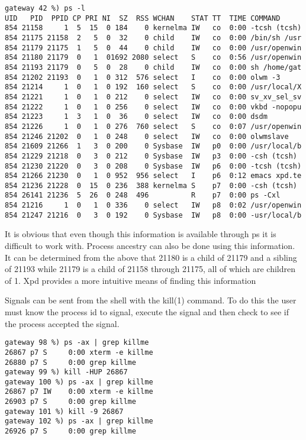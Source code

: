 \begin{verbatim}
gateway 42 %) ps -l
UID   PID  PPID CP PRI NI  SZ  RSS WCHAN    STAT TT  TIME COMMAND
854 21158     1  5  15  0 184    0 kernelma IW   co  0:00 -tcsh (tcsh)
854 21175 21158  2   5  0  32    0 child    IW   co  0:00 /bin/sh /usr
854 21179 21175  1   5  0  44    0 child    IW   co  0:00 /usr/openwin
854 21180 21179  0   1  01692 2080 select   S    co  0:56 /usr/openwin
854 21193 21179  0   5  0  28    0 child    IW   co  0:00 sh /home/gat
854 21202 21193  0   1  0 312  576 select   I    co  0:00 olwm -3
854 21214     1  0   1  0 192  160 select   S    co  0:00 /usr/local/X
854 21221     1  0   1  0 212    0 select   IW   co  0:00 sv_xv_sel_sv
854 21222     1  0   1  0 256    0 select   IW   co  0:00 vkbd -nopopu
854 21223     1  3   1  0  36    0 select   IW   co  0:00 dsdm
854 21226     1  0   1  0 276  760 select   S    co  0:07 /usr/openwin
854 21246 21202  0   1  0 248    0 select   IW   co  0:00 olwmslave
854 21609 21266  1   3  0 200    0 Sysbase  IW   p0  0:00 /usr/local/b
854 21229 21218  0   3  0 212    0 Sysbase  IW   p3  0:00 -csh (tcsh)
854 21230 21220  0   3  0 208    0 Sysbase  IW   p6  0:00 -tcsh (tcsh)
854 21266 21230  0   1  0 952  956 select   I    p6  0:12 emacs xpd.te
854 21236 21228  0  15  0 236  388 kernelma S    p7  0:00 -csh (tcsh)
854 26141 21236  5  26  0 248  496          R    p7  0:00 ps -Cxl
854 21216     1  0   1  0 336    0 select   IW   p8  0:02 /usr/openwin
854 21247 21216  0   3  0 192    0 Sysbase  IW   p8  0:00 -usr/local/b
\end{verbatim}

It is obvious that even though this information is available through ps it is difficult to work with.
Process ancestry can also be done using this information.
It can be determined from the above that 21180 is a child of 21179 and a sibling of 21193 while 21179 is a child of 21158 through 21175, all of which are children of 1.
Xpd provides a more intuitive means of finding this information

Signals can be sent from the shell with the kill(1) command.
To do this the user must know the process id to signal, execute the signal and then check to see if the process accepted the signal.

\begin{verbatim}
gateway 98 %) ps -ax | grep killme
26867 p7 S     0:00 xterm -e killme
26880 p7 S     0:00 grep killme
gateway 99 %) kill -HUP 26867
gateway 100 %) ps -ax | grep killme
26867 p7 IW    0:00 xterm -e killme
26903 p7 S     0:00 grep killme
gateway 101 %) kill -9 26867
gateway 102 %) ps -ax | grep killme
26926 p7 S     0:00 grep killme
\end{verbatim}


